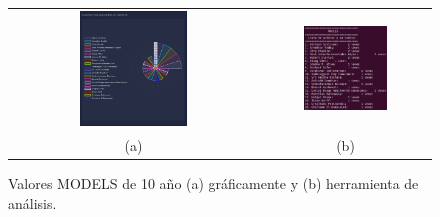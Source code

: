 \documentclass[a4paper, 12pt]{book}
\begin{document}
\begin{figure}[!h]
    \centering
    \begin{tabular}{cc}
    \includegraphics[width=0.45\textwidth]{img/models_10_years_graph.png} &  
    \includegraphics[width=0.52\textwidth]{img/models_10_years.png} \\ 
    (a) &(b) 
    \end{tabular}
    \caption{Valores MODELS de 10 año (a) gráficamente y (b) herramienta de análisis.}
    \label{fig:comp_models_10_year}
\end{figure}
\end{document}
